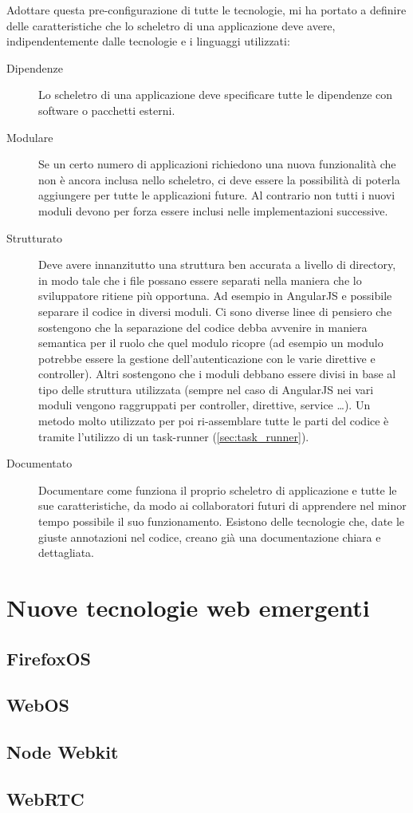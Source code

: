 Adottare questa pre-configurazione di tutte le tecnologie, mi ha portato a definire delle caratteristiche che lo scheletro di una applicazione deve avere, indipendentemente dalle tecnologie e i linguaggi utilizzati:

\begin{description}
\item[Dipendenze] Lo scheletro di una applicazione deve specificare tutte le dipendenze con software o pacchetti esterni.

\item[Modulare] Se un certo numero di applicazioni richiedono una nuova funzionalità che non è ancora inclusa nello scheletro, ci deve essere la possibilità di poterla aggiungere per tutte le applicazioni future. Al contrario non tutti i nuovi moduli devono per forza essere inclusi nelle implementazioni successive.

\item[Strutturato] Deve avere innanzitutto una struttura ben accurata a livello di directory, in modo tale che i file possano essere separati nella maniera che lo sviluppatore ritiene più opportuna. Ad esempio in AngularJS e possibile separare il codice in diversi moduli. Ci sono diverse linee di pensiero che sostengono che la separazione del codice debba avvenire in maniera semantica per il ruolo che quel modulo ricopre (ad esempio un modulo potrebbe essere la gestione dell'autenticazione con le varie direttive e controller). Altri sostengono che i moduli debbano essere divisi in base al tipo delle struttura utilizzata (sempre nel caso di AngularJS nei vari moduli vengono raggruppati per controller, direttive, service \ldots).
Un metodo molto utilizzato per poi ri-assemblare tutte le parti del codice è tramite l'utilizzo di un task-runner (\ref{sec:task_runner}).

\item[Documentato] Documentare come funziona il proprio scheletro di applicazione e tutte le sue caratteristiche, da modo ai collaboratori futuri di apprendere nel minor tempo possibile il suo funzionamento. Esistono delle tecnologie che, date le giuste annotazioni nel codice, creano già una documentazione chiara e dettagliata.
\end{description} 

\section{Nuove tecnologie web emergenti}

\subsection{FirefoxOS}

\subsection{WebOS}

\subsection{Node Webkit}

\subsection{WebRTC}